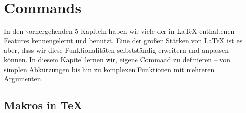 \chapter{Commands}

In den vorhergehenden 5 Kapiteln haben wir viele der in \LaTeX{} enthaltenen Features kennengelernt und benutzt.
Eine der großen Stärken von \LaTeX{} ist es aber, dass wir diese Funktionalitäten selbstständig erweitern und anpassen können.
In diesem Kapitel lernen wir, eigene Command zu definieren -- von simplen Abkürzungen bis hin zu komplexen Funktionen mit mehreren Argumenten.

\section{Makros in \TeX}

